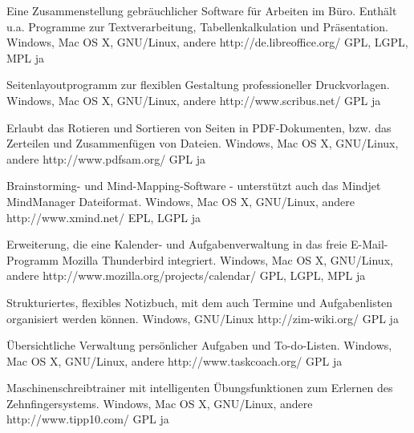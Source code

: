 \documentclass[11pt,a4paper,landscape,twocolumn]{article}
\begin{document}


{Eine Zusammenstellung gebräuchlicher Software für Arbeiten im Büro. Enthält u.a. Programme zur Textverarbeitung, Tabellenkalkulation und Präsentation.}
{Windows, Mac OS X, GNU/Linux, andere}
{http://de.libreoffice.org/}
{GPL, LGPL, MPL}
{ja}

{Seitenlayoutprogramm zur flexiblen Gestaltung professioneller Druckvorlagen.}
{Windows, Mac OS X, GNU/Linux, andere}
{http://www.scribus.net/}
{GPL}
{ja}

{Erlaubt das Rotieren und Sortieren von Seiten in PDF-Dokumenten, bzw. das Zerteilen und Zusammenfügen von Dateien.}
{Windows, Mac OS X, GNU/Linux, andere}
{http://www.pdfsam.org/}
{GPL}
{ja}

{Brainstorming- und Mind-Mapping-Software - unterstützt auch das Mindjet MindManager Dateiformat.}
{Windows, Mac OS X, GNU/Linux, andere}
{http://www.xmind.net/}
{EPL, LGPL}
{ja}


\newpage %


{Erweiterung, die eine Kalender- und Aufgabenverwaltung in das freie E-Mail-Programm Mozilla Thunderbird integriert.}
{Windows, Mac OS X, GNU/Linux, andere}
{http://www.mozilla.org/projects/calendar/}
{GPL, LGPL, MPL}
{ja}

{Strukturiertes, flexibles Notizbuch, mit dem auch Termine und Aufgabenlisten organisiert werden können.}
{Windows, GNU/Linux}
{http://zim-wiki.org/}
{GPL}
{ja}

{Übersichtliche Verwaltung persönlicher Aufgaben und To-do-Listen.}
{Windows, Mac OS X, GNU/Linux, andere}
{http://www.taskcoach.org/}
{GPL}
{ja}

{Maschinenschreibtrainer mit intelligenten Übungsfunktionen zum Erlernen des Zehnfingersystems.}
{Windows, Mac OS X, GNU/Linux, andere}
{http://www.tipp10.com/}
{GPL}
{ja}
\end{document}
